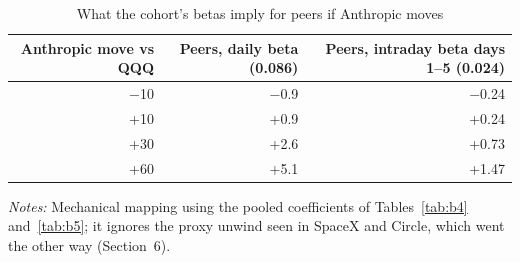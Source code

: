 \begin{table}[!htbp]\centering\footnotesize
\caption{What the cohort's betas imply for peers if Anthropic moves}\label{tab:b9}

\begin{threeparttable}
\begin{tabular}{rrr}
\toprule
Anthropic move vs QQQ & Peers, daily beta (0.086) & Peers, intraday beta days 1--5 (0.024) \\
\midrule
$-$10 & $-$0.9 & $-$0.24 \\
+10 & +0.9 & +0.24 \\
+30 & +2.6 & +0.73 \\
+60 & +5.1 & +1.47 \\
\bottomrule
\end{tabular}
\begin{tablenotes}[flushleft]\footnotesize
\item \textit{Notes:} Mechanical mapping using the pooled coefficients of Tables~\ref{tab:b4} and~\ref{tab:b5}; it ignores the proxy unwind seen in SpaceX and Circle, which went the other way (Section~6).
\end{tablenotes}
\end{threeparttable}

\end{table}
